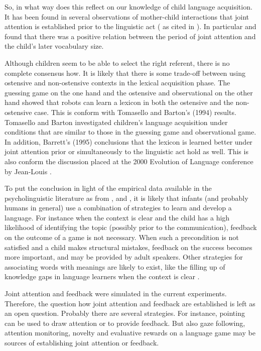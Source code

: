 So, in what way does this reflect on our knowledge of child language acquisition. It has been found in several observations of mother-child interactions that joint attention is established prior to the linguistic act (\citealt{schafferetal:1983,harrisetal:1983,harrisetal:1984,tomasellotodd:1983,tomaselloetal:1986} as cited in \citealt{barrett:1995}). In particular \citet{tomasellotodd:1983} and \citet{tomaselloetal:1986} found that there was a positive relation between the period of joint attention and the child's later vocabulary size.  

Although children seem to be able to select the right referent, there is no complete consensus how. It is likely that there is some trade-off between using ostensive and non-ostensive contexts in the lexical acquisition phase. The guessing game on the one hand and the ostensive and observational on the other hand showed that robots can learn a lexicon in both the ostensive and the non-ostensive case. This is conform with Tomasello and Barton's (1994) results. Tomasello and Barton investigated children's language acquisition under conditions that are similar to those in the guessing game and observational game. In addition, Barrett's (1995) conclusions that the lexicon is learned better under joint attention prior or simultaneously to the linguistic act hold as well. This is also conform the discussion placed at the 2000 Evolution of Language conference by Jean-Louis \citet{dessalles:2000}.


To put the conclusion in light of the empirical data available in the psycholinguistic literature as from \citet{braine:1971}, \citet{demetrasetal:1986} and \citet{tomasellobarton:1994}, it is likely that infants (and probably humans in general) use a combination of strategies to learn and develop a language. For instance when the context is clear and the child has a high likelihood of identifying the topic (possibly prior to the communication), feedback on the outcome of a game is not necessary. When such a precondition is not satisfied and a child makes structural mistakes, feedback on the success becomes more important, and may be provided by adult speakers. Other strategies for associating words with meanings are likely to exist, like the filling up of knowledge gaps in language learners when the context is clear \citep{clark:1993}.
 

Joint attention and feedback were simulated in the current experiments. Therefore, the question how joint attention and feedback are established is left as an open question. Probably there are several strategies. For instance, pointing can be used to draw attention or to provide feedback. But also gaze following, attention monitoring, novelty and evaluative rewards on a language game may be sources of establishing joint attention or feedback. 


